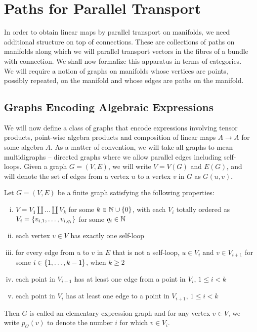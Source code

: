 \documentclass[./Thick_TQFTs_and_Quantum_Information.tex]{subfiles}
\begin{document}
\section{Paths for Parallel Transport}

In order to obtain linear maps by parallel transport on manifolds, we need
additional structure on top of connections. These are collections of paths on
manifolds along which we will parallel transport vectors in the fibres of a
bundle with connection. We shall now formalize this apparatus in terms of
categories. We will require a notion of graphs on manifolds whose vertices are
points, possibly repeated, on the manifold and whose edges are paths on the
manifold.

\subsection{Graphs Encoding Algebraic Expressions}

We will now define a class of graphs that encode expressions involving tensor
products, point-wise algebra products and composition of linear maps $A \to A$
for some algebra $A$. As a matter of convention, we will take all graphs to mean
multidigraphs -- directed graphs where we allow parallel edges including
self-loops. Given a graph $G = (V, E)$, we will write $V = V(G)$ and $E(G)$, and
will denote the set of edges from a vertex $u$ to a vertex $v$ in $G$ as
$G(u, v)$.

\begin{defn}\label{eeg}
Let $G = (V, E)$ be a finite graph satisfying the following properties:
\begin{enumerate}[(i)]

\setlength{\itemsep}{0pt}

\item \label{eeg:part}
$V = V_1 \amalg \dots \amalg V_k$ for some $k \in \N \cup \set{0}$, with each
$V_i$ totally ordered as $V_i = \set{v_{i, 1}, \dots, v_{i, q_i}}$ for some
$q_i \in \mathbb{N}$

\item \label{eeg:loop}
each vertex $v \in V$ has exactly one self-loop

\item \label{eeg:forward}
for every edge from $u$ to $v$ in $E$ that is not a self-loop, $u \in V_i$ and
$v \in V_{i + 1}$ for some $i \in \set{1, \dots, k - 1}$, when $k \geq 2$

\item \label{eeg:nonredright}
each point in $V_{i + 1}$ has at least one edge from a point in $V_{i}$,
$1 \leq i < k$

\item \label{eeg:nonredleft}
each point in $V_{i}$ has at least one edge to a point in $V_{i + 1}$,
$1 \leq i < k$

\end{enumerate}
Then $G$ is called an elementary expression graph and for any vertex $v \in V$,
we write $p_{G}(v)$ to denote the number $i$ for which $v \in V_i$.
\end{defn}
\end{document}
